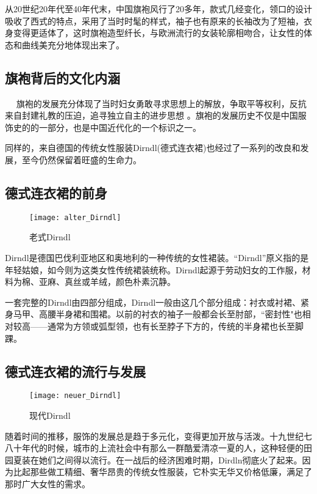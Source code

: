     从20世纪20年代至40年代末，中国旗袍风行了20多年，款式几经变化，领口的设计吸收了西式的特点，采用了当时时髦的样式，袖子也有原来的长袖改为了短袖，衣身变得更适体了，这时旗袍造型纤长，与欧洲流行的女装轮廓相吻合，让女性的体态和曲线美充分地体现出来了。 

\subsection{旗袍背后的文化内涵}

    旗袍的发展充分体现了当时妇女勇敢寻求思想上的解放，争取平等权利，反抗来自封建礼教的压迫，追寻独立自主的进步思想 。旗袍的发展历史不仅是中国服饰史的的一部分，也是中国近代化的一个标识之一。

    同样的，来自德国的传统女性服装Dirndl(德式连衣裙)也经过了一系列的改良和发展，至今仍然保留着旺盛的生命力。

\subsection{德式连衣裙的前身}
\begin{figure}[htb]
    \centering
    \texttt{[image: alter\_Dirndl]}
    \caption{老式Dirndl}
\end{figure}

    Dirndl是德国巴伐利亚地区和奥地利的一种传统的女性裙装。“Dirndl”原义指的是年轻姑娘，如今则为这类女性传统裙装统称。Dirndl起源于劳动妇女的工作服，材料为棉、亚麻、真丝或羊绒，颜色朴素沉静。 

    一套完整的Dirndl由四部分组成，Dirndl一般由这几个部分组成：衬衣或衬裙、紧身马甲、高腰半身裙和围裙。以前的衬衣的袖子一般都会长至肘部，“密封性"也相对较高——通常为方领或弧型领，也有长至脖子下方的，传统的半身裙也长至脚踝。 

\subsection{德式连衣裙的流行与发展}  
\begin{figure}[htb]
    \centering
    \texttt{[image: neuer\_Dirndl]}
    \caption{现代Dirndl}
\end{figure}

    随着时间的推移，服饰的发展总是趋于多元化，变得更加开放与活泼。十九世纪七八十年代的时候，城市的上流社会中有那么一群酷爱清凉一夏的人，这种轻便的田园夏装在她们之间得以流行。在一战后的经济困难时期，Dirdln彻底火了起来。因为比起那些做工精细、奢华昂贵的传统女性服装，它朴实无华又价格低廉，满足了那时广大女性的需求。

